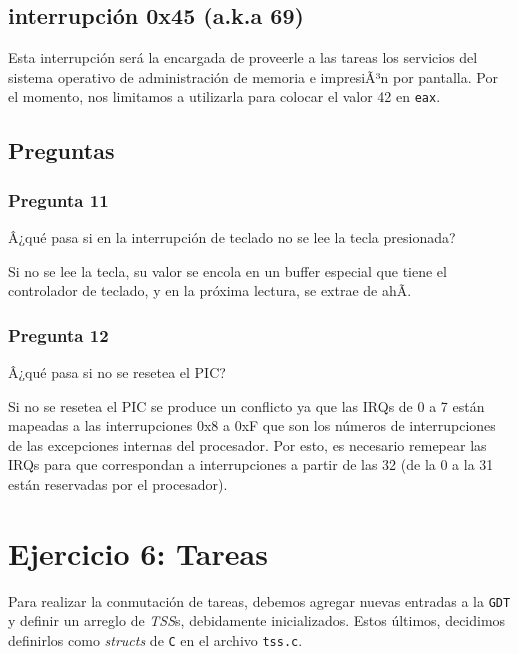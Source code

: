 \documentclass[10pt, a4paper]{article}
\begin{document}
\subsection{interrupción 0x45 (a.k.a 69)}
Esta interrupción será la encargada de proveerle a las tareas los servicios del sistema operativo de administración de memoria e impresiÃ³n por pantalla. Por el momento, nos limitamos a utilizarla para colocar el valor 42 en \texttt{eax}.

\subsection{Preguntas}
\subsubsection*{Pregunta 11}
 \begin{framed}
Â¿qué pasa si en la interrupción de teclado no se lee la tecla presionada?
\end{framed}
Si no se lee la tecla, su valor se encola en un buffer especial que tiene el controlador de teclado, y en la próxima lectura, se extrae de ahÃ­.

\subsubsection*{Pregunta 12}
 \begin{framed}
Â¿qué pasa si no se resetea el PIC?
\end{framed}
Si no se resetea el PIC se produce un conflicto ya que las IRQs de 0 a 7 están mapeadas a las interrupciones 0x8 a 0xF que son los números de interrupciones
de las excepciones internas del procesador. Por esto, es necesario remepear las IRQs para que correspondan a interrupciones a partir de las 32 (de la 0 a la 31
están reservadas por el procesador).

\newpage

\section{Ejercicio 6: Tareas}
Para realizar la conmutación de tareas, debemos agregar nuevas entradas a la \texttt{GDT} y definir un arreglo de \emph{TSS}s, debidamente inicializados. 
Estos últimos, decidimos definirlos como \emph{structs} de \texttt{C} en el archivo \texttt{tss.c}.
\end{document}
